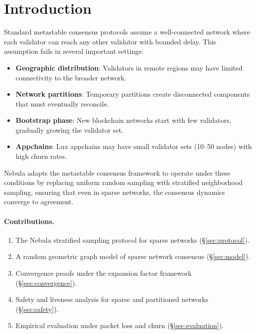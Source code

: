 \section{Introduction}

\label{sec:introduction}

Standard metastable consensus protocols assume a well-connected network where each
validator can reach any other validator with bounded delay. This assumption fails in
several important settings:

\begin{itemize}[nosep]
\item \textbf{Geographic distribution}: Validators in remote regions may have limited
connectivity to the broader network.
\item \textbf{Network partitions}: Temporary partitions create disconnected components
that must eventually reconcile.
\item \textbf{Bootstrap phase}: New blockchain networks start with few validators,
gradually growing the validator set.
\item \textbf{Appchains}: Lux appchains may have small validator sets (10--50 nodes)
with high churn rates.
\end{itemize}

Nebula adapts the metastable consensus framework to operate under these conditions by
replacing uniform random sampling with stratified neighborhood sampling, ensuring that
even in sparse networks, the consensus dynamics converge to agreement.

\paragraph{Contributions.}
\begin{enumerate}[nosep]
\item The Nebula stratified sampling protocol for sparse networks (\S\ref{sec:protocol}).
\item A random geometric graph model of sparse network consensus (\S\ref{sec:model}).
\item Convergence proofs under the expansion factor framework (\S\ref{sec:convergence}).
\item Safety and liveness analysis for sparse and partitioned networks (\S\ref{sec:safety}).
\item Empirical evaluation under packet loss and churn (\S\ref{sec:evaluation}).
\end{enumerate}

